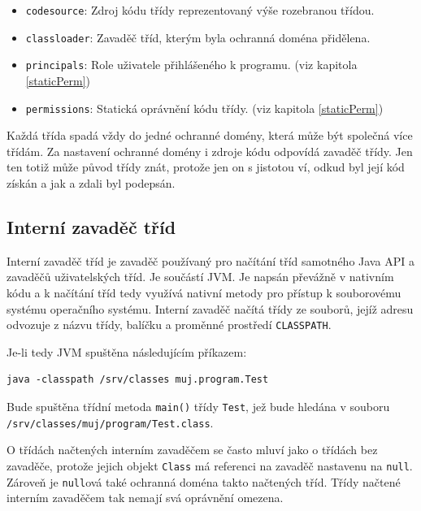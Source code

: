 \begin{itemize}
  \item {\tt codesource}: Zdroj kódu třídy reprezentovaný výše rozebranou třídou.
  \item {\tt classloader}: Zavaděč tříd, kterým byla ochranná doména přidělena.
  \item {\tt principals}: Role uživatele přihlášeného k programu. (viz kapitola \ref{staticPerm})
  \item {\tt permissions}: Statická oprávnění kódu třídy. (viz kapitola \ref{staticPerm})
\end{itemize}

Každá třída spadá vždy do jedné ochranné domény, která může být společná více třídám. Za nastavení ochranné domény i zdroje kódu odpovídá zavaděč třídy. Jen ten totiž může původ třídy znát, protože jen on s jistotou ví, odkud byl její kód získán a jak a zdali byl podepsán.

\subsection{Interní zavaděč tříd} \label{interniZavadec}

Interní zavaděč tříd je zavaděč používaný pro načítání tříd samotného Java API a zavaděčů uživatelských tříd.
Je součástí JVM. Je napsán převážně v nativním kódu a k načítání tříd tedy využívá nativní metody pro přístup k souborovému systému operačního systému.
Interní zavaděč načítá třídy ze souborů, jejíž adresu odvozuje z názvu třídy, balíčku a proměnné prostředí {\tt CLASSPATH}. \cite[3.2.1]{oaks}

Je-li tedy JVM spuštěna následujícím příkazem:

\begin{lstlisting}[caption=Spuštění JVM s předefinovanou proměnnou {\tt CLASSPATH}, label=javaClasspath]
java -classpath /srv/classes muj.program.Test
\end{lstlisting}

Bude spuštěna třídní metoda {\tt main()} třídy {\tt Test}, jež bude hledána v souboru {\tt /srv/classes/muj/program/Test.class}.

O třídách načtených interním zavaděčem se často mluví jako o třídách bez zavaděče, protože jejich objekt {\tt Class} má referenci na zavaděč nastavenu na {\tt null}. \cite[3.2.1]{oaks} Zároveň je {\tt null}ová také ochranná doména takto načtených tříd. Třídy načtené interním zavaděčem tak nemají svá oprávnění omezena. \cite[5.4]{oaks}

